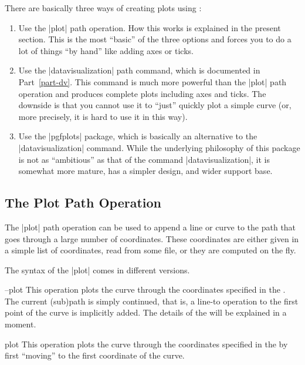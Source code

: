 There are basically three ways of creating plots using \tikzname:

\begin{enumerate}
\item Use the |plot| path operation. How this works is explained in
  the present section. This is the most ``basic'' of the three options
  and forces you to do a lot of things ``by hand'' like adding axes or
  ticks.
\item Use the |datavisualization| path command, which is documented in
  Part~\ref{part-dv}. This command is much more powerful than the
  |plot| path operation and produces complete plots including axes and
  ticks. The downside is that you cannot use it to ``just'' quickly
  plot a simple curve (or, more precisely, it is hard to use it in
  this way).
\item Use the |pgfplots| package, which is basically an alternative to
  the |datavisualization| command. While the underlying philosophy of
  this package is not as ``ambitious'' as that of the command
  |datavisualization|, it is somewhat more mature, has a
  simpler design, and wider support base. 
\end{enumerate}


\subsection{The Plot Path Operation}

The |plot| path operation can be used to append a line or curve to the path
that goes through a large number of coordinates. These coordinates are
either given in a simple list of coordinates, read from some file, or
they are computed on the fly.

The syntax of the |plot| comes in different versions.

\begin{pathoperation}{--plot}{}
  This operation plots the curve through the coordinates specified in
  the . The current (sub)path is simply
  continued, that is, a line-to operation to the first point of the
  curve is implicitly added. The details of the   will be explained in a moment.
\end{pathoperation}

\begin{pathoperation}{plot}{}
  This operation plots the curve through the coordinates specified in
  the  by first ``moving'' to the first
  coordinate of the curve.
\end{pathoperation}

